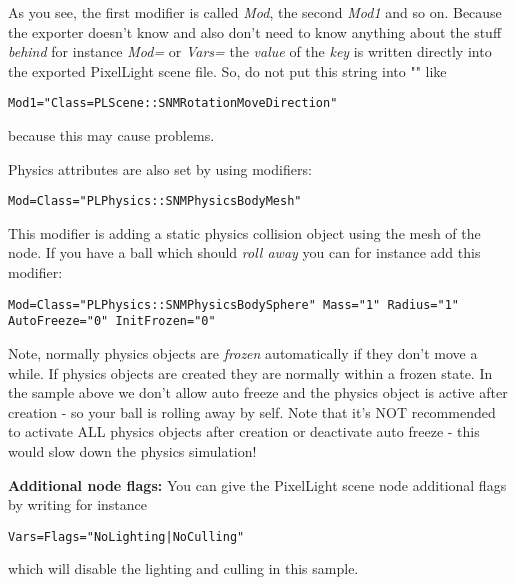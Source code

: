 As you see, the first modifier is called \emph{Mod}, the second \emph{Mod1} and so on. Because the exporter doesn't know and also don't need to know anything about the stuff \emph{behind} for instance \emph{Mod=} or \emph{Vars=} the \emph{value} of the \emph{key} is written directly into the exported PixelLight scene file. So, do not put this string into "" like

\begin{lstlisting}[caption=Invalid scene node modifier definition]
Mod1="Class=PLScene::SNMRotationMoveDirection"
\end{lstlisting}

because this may cause problems.

Physics attributes are also set by using modifiers:

\begin{lstlisting}[caption=Physics mesh scene node modifier]
Mod=Class="PLPhysics::SNMPhysicsBodyMesh"
\end{lstlisting}

This modifier is adding a static physics collision object using the mesh of the node. If you have a ball which should \emph{roll away} you can for instance add this modifier:

\begin{lstlisting}[caption=Physics sphere scene node modifier]
Mod=Class="PLPhysics::SNMPhysicsBodySphere" Mass="1" Radius="1" AutoFreeze="0" InitFrozen="0"
\end{lstlisting}

Note, normally physics objects are \emph{frozen} automatically if they don't move a while. If physics objects are created they are normally within a frozen state. In the sample above we don't allow auto freeze and the physics object is active after creation - so your ball is rolling away by self. Note that it's NOT recommended to activate ALL physics objects after creation or deactivate auto freeze - this would slow down the physics simulation!


\textbf{Additional node flags:}
You can give the PixelLight scene node additional flags by writing for instance

\begin{lstlisting}[caption=Setting scene node flags]
Vars=Flags="NoLighting|NoCulling"
\end{lstlisting}

which will disable the lighting and culling in this sample.
